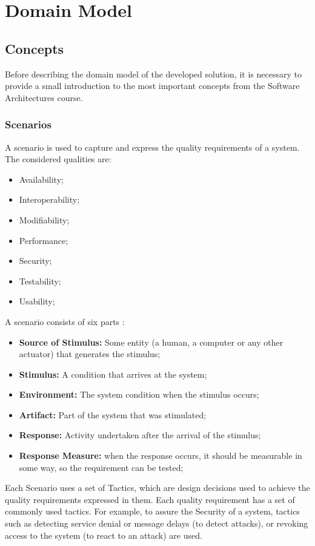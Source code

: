 \chapter{Domain Model}
\label{chapter:domainModel}

\section{Concepts}
\label{section:SAConcepts}
Before describing the domain model of the developed solution, it is necessary to provide a small introduction to the most important concepts from the Software Architectures course.
\subsection{Scenarios}
A scenario is used to capture and express the quality requirements of a system. The considered qualities are:
\begin{itemize}
\item Availability;
\item Interoperability;
\item Modifiability;
\item Performance;
\item Security;
\item Testability;
\item Usability;
\end{itemize}

A scenario consists of six parts \cite{bass2003software}:
\begin{itemize}
\item \textbf{Source of Stimulus:} Some entity (a human, a computer or any other actuator) that generates the stimulus;
\item \textbf{Stimulus:} A condition that arrives at the system;
\item \textbf{Environment:} The system condition when the stimulus occurs;
\item \textbf{Artifact:} Part of the system that was stimulated;
\item \textbf{Response:} Activity undertaken after the arrival of the stimulus;
\item \textbf{Response Measure:} when the response occurs, it should be measurable in some way, so the requirement can be tested;
\end{itemize}

Each Scenario uses a set of Tactics, which are design decisions used to achieve the quality requirements expressed in them. Each quality requirement has a set of commonly used tactics. For example, to assure the Security of a system, tactics such as detecting service denial or message delays (to detect attacks), or revoking access to the system (to react to an attack) are used.

